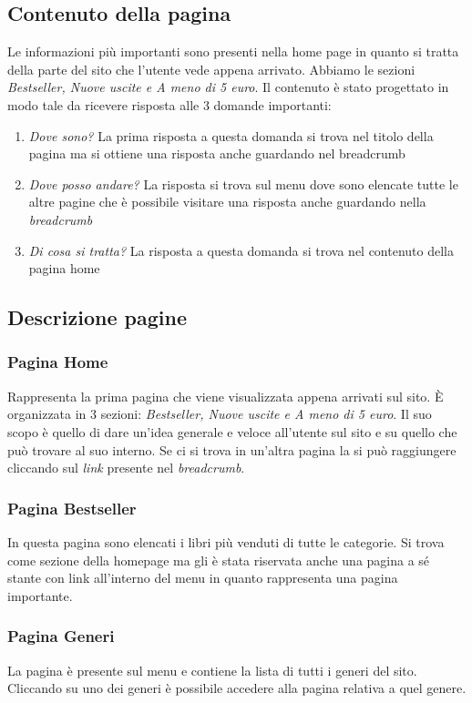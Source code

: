 	
\subsection{Contenuto della pagina}
Le informazioni più importanti sono presenti nella home page in quanto si tratta della parte del sito che l’utente vede appena arrivato. Abbiamo le sezioni \textit{Bestseller, Nuove uscite e A meno di 5 euro}. Il contenuto è stato progettato in modo tale da ricevere risposta alle 3 domande importanti:
\begin{enumerate}
	\item \textit{Dove sono?} La prima risposta a questa domanda si trova nel titolo della pagina ma si ottiene una risposta anche guardando nel breadcrumb
	\item \textit{Dove posso andare?} La risposta si trova sul menu dove sono elencate tutte le altre pagine che è possibile visitare
		una risposta anche guardando nella \textit{breadcrumb}
	\item \textit{Di cosa si tratta?} La risposta a questa domanda si trova nel contenuto della pagina home
	\end{enumerate}

\subsection{Descrizione pagine}
\subsubsection{Pagina Home}
Rappresenta la prima pagina che viene visualizzata appena arrivati sul sito. È organizzata in 3 sezioni: \textit{Bestseller, Nuove uscite e A meno di 5 euro}. Il suo scopo è quello di dare un'idea generale e veloce all'utente sul sito e su quello che può trovare al suo interno. Se ci si trova in un’altra pagina la si può raggiungere cliccando sul \textit{link} presente nel \textit{breadcrumb}.

\subsubsection{Pagina Bestseller}
In questa pagina sono elencati i libri più venduti di tutte le categorie. Si trova come sezione della homepage ma gli è stata riservata anche una pagina a sé stante con link all’interno del menu in quanto rappresenta una pagina importante.

\subsubsection{Pagina Generi}
La pagina è presente sul menu e contiene la lista di tutti i generi del sito. Cliccando su uno dei generi è possibile accedere alla pagina relativa a quel genere.

